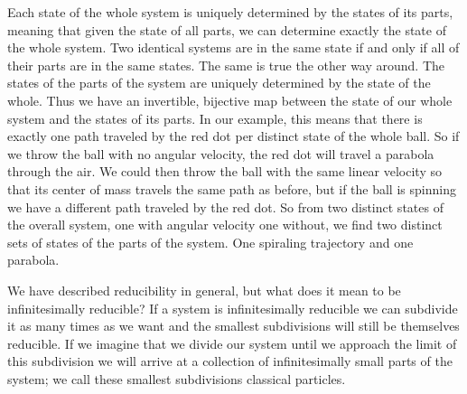 \documentclass{article}
\begin{document}
	
	Each state of the whole system is uniquely determined by the states of its parts, meaning that given the state of all parts, we can determine exactly the state of the whole system. Two identical systems are in the same state if and only if all of their parts are in the same states. The same is true the other way around. The states of the parts of the system are uniquely determined by the state of the whole. Thus we have an invertible, bijective map between the state of our whole system and the states of its parts. In our example, this means that there is exactly one path traveled by the red dot per distinct state of the whole ball. So if we throw the ball with no angular velocity, the red dot will travel a parabola through the air. We could then throw the ball with the same linear velocity so that its center of mass travels the same path as before, but if the ball is spinning we have a different path traveled by the red dot. So from two distinct states of the overall system, one with angular velocity one without, we find two distinct sets of states of the parts of the system. One spiraling trajectory and one parabola.
		
	 
	 
	 We have described reducibility in general, but what does it mean to be infinitesimally reducible? If a system is infinitesimally reducible we can subdivide it as many times as we want and the smallest subdivisions will still be themselves reducible. If we imagine that we divide our system until we approach the limit of this subdivision we will arrive at a collection of infinitesimally small parts of the system; we call these smallest subdivisions classical particles.
	 
\end{document}
